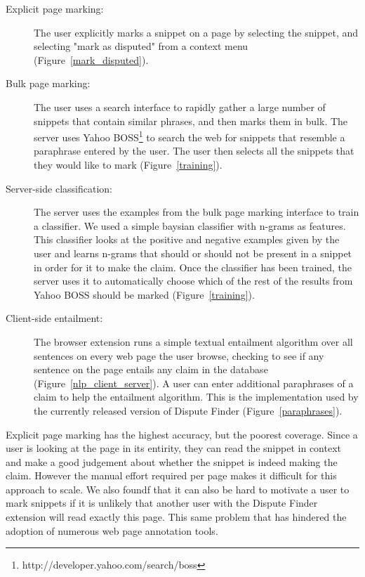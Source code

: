 \documentclass{www2010-submission}
\newcommand{\todo}[1]{}
\begin{document}
\begin{description}
\item[Explicit page marking:] The user explicitly marks a snippet on a page by selecting the snippet, and selecting "mark as disputed" from a context menu (Figure~\ref{mark_disputed}).

\item[Bulk page marking:] The user uses a search interface to rapidly gather a large number of snippets that contain similar phrases, and then marks them in bulk. The server uses Yahoo BOSS\footnote{http://developer.yahoo.com/search/boss} to search the web for snippets that resemble a paraphrase entered by the user. The user then selects all the snippets that they would like to mark (Figure~\ref{training}).

\item[Server-side classification:] The server uses the examples from the bulk page marking interface to train a classifier. We used a simple baysian classifier with n-grams as features. This classifier looks at the positive and negative examples given by the user and learns n-grams that should or should not be present in a snippet in order for it to make the claim.  Once the classifier has been trained, the server uses it to automatically choose which of the rest of the results from Yahoo BOSS should be marked (Figure~\ref{training}).

\todo{Should we say that we didn't completely finish this version?}

\todo{Has anyone done something like this before.}
\todo{We only partially implemented this approach}

\item[Client-side entailment:] The browser extension runs a simple textual entailment algorithm over all sentences on every web page the user browse, checking to see if any sentence on the page entails any claim in the database (Figure~\ref{nlp_client_server}). A user can enter additional paraphrases of a claim to help the entailment algorithm. This is the implementation used by the currently released version of Dispute Finder (Figure~\ref{paraphrases}).
\end{description}

Explicit page marking has the highest accuracy, but the poorest coverage. Since a user is looking at the page in its entirity, they can read the snippet in context and make a good judgement about whether the snippet is indeed making the claim. However the manual effort required per page makes it difficult for this approach to scale. We also foundf that it can also be hard to motivate a user to mark snippets if it is unlikely that another user with the Dispute Finder extension will read exactly this page. This same problem that has hindered the adoption of numerous web page annotation tools.
\end{document}
